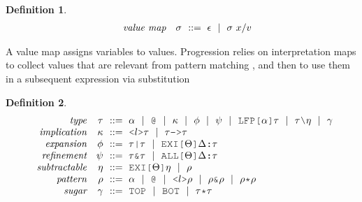\documentclass[table,dvipsnames,acmsmall]{acmart}
\theoremstyle{definition}
\newtheorem{definition}{Definition}[section]
\begin{document}
\begin{definition}
  \label{def:value_map}
  \small
  \nopad
  \[\begin{array}[t]{rr@{}l}
    \com{value map} &
    \nonterm{\sigma} & \is \epsilon \sep \sigma\ x \slash v 
  \end{array}\]
\end{definition}

\noindent
A value map assigns variables to values.
Progression relies on interpretation maps to collect
values that are relevant from pattern matching ,
and then to use them in a subsequent expression via substitution 


\begin{definition}
  \label{def:type}
  \small
  \nopad
  \[\begin{array}[t]{rr@{}l}
    \com{type} &
    \nonterm{\tau} & \is 
    \begin{array}[t]{@{}l}
      \alpha \sep
      \J{@} \sep
      \kappa \sep 
      \phi \sep 
      \psi \sep 
      \J{LFP[}\alpha\J{]}\tau \sep
      \tau \typdiff \eta \sep
      \gamma
    \end{array}
    \\
    \com{implication} &
    \nonterm{\kappa} & \is 
    \begin{array}[t]{@{}l}
      \J{<} l \J{>} \tau \sep 
      \tau\J{->}\tau
    \end{array}
    \\
    \com{expansion} &
    \nonterm{\phi} & \is 
    \begin{array}[t]{@{}l}
      \tau\J{|}\tau \sep 
      \J{EXI[}\Theta\J{]} \Delta \J{:} \tau
    \end{array}
    \\
    \com{refinement} &
    \nonterm{\psi} & \is 
    \begin{array}[t]{@{}l}
      \tau\J{\&}\tau \sep 
      \J{ALL[}\Theta\J{]} \Delta \J{:} \tau
    \end{array}
    \\
    \com{subtractable} &
    \nonterm{\eta} & \is 
    \begin{array}[t]{@{}l}
      \J{EXI[}\Theta \J{]} \eta \sep 
      \rho
    \end{array}
    \\
    \com{pattern} &
    \nonterm{\rho} & \is 
    \begin{array}[t]{@{}l}
      \alpha \sep
      \J{@} \sep
      \J{<}l\J{>}\rho \sep 
      \rho\J{\&}\rho \sep
      \rho\J{*}\rho
    \end{array}
    \\
    \com{sugar} &
    \nonterm{\gamma} & \is 
    \begin{array}[t]{@{}l}
      \J{TOP} \sep \J{BOT} \sep 
      \tau \J{*} \tau 
    \end{array}
  \end{array}\]
\end{definition}
\end{document}
